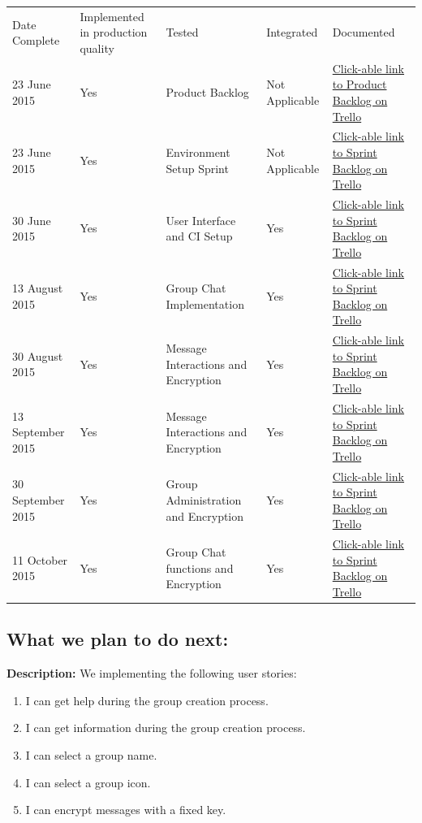 \documentclass[a4paper]{article}
\begin{document}
\setlength{\arrayrulewidth}{0.5mm}
\setlength{\tabcolsep}{12pt}
\renewcommand{\arraystretch}{2} 
\begin{tabular}{ |p{2.5cm}|p{2.5cm}|p{2.5cm}|p{2.5cm}| p{2.5cm}| }
\hline
\rowcolor{lightgray} \multicolumn{5}{|c|}{Completed Work} \\
\hline
Date Complete & Implemented in production quality & Tested & Integrated & Documented \\
\hline
23 June 2015 & Yes & Product Backlog & Not Applicable & \href{https://trello.com/b/FtBs3HX1}{Click-able link to Product Backlog on Trello}\\ \hline
23 June 2015 & Yes & Environment Setup Sprint & Not Applicable & \href{https://trello.com/b/hBJF6EUd}{Click-able link to Sprint Backlog on Trello}\\ 
\hline
30 June 2015 & Yes & User Interface and CI Setup & Yes & \href{https://trello.com/b/hBJF6EUd}{Click-able link to Sprint Backlog on Trello}\\ 
\hline
13 August 2015 & Yes & Group Chat Implementation & Yes & \href{https://trello.com/b/hBJF6EUd}{Click-able link to Sprint Backlog on Trello}\\ 
\hline
30 August 2015 & Yes & Message Interactions and Encryption & Yes & \href{https://trello.com/b/hBJF6EUd}{Click-able link to Sprint Backlog on Trello}\\ 
\hline
13 September 2015 & Yes & Message Interactions and Encryption & Yes & \href{https://trello.com/b/hBJF6EUd}{Click-able link to Sprint Backlog on Trello}\\ 
\hline
30 September 2015 & Yes & Group Administration and Encryption & Yes & \href{https://trello.com/b/hBJF6EUd}{Click-able link to Sprint Backlog on Trello}\\ 
\hline
11 October 2015 & Yes & Group Chat functions and Encryption & Yes & \href{https://trello.com/b/hBJF6EUd}{Click-able link to Sprint Backlog on Trello}\\ 
\hline
\end{tabular}

\subsection{What we plan to do next:}
\textbf{Description: }We implementing the following user stories:
\begin{enumerate} 
\item I can get help during the group creation process.
\item I can get information during the group creation process.
\item I can select a group name.
\item I can select a group icon.
\item I can encrypt messages with a fixed key.
\end{enumerate}
\end{document}
